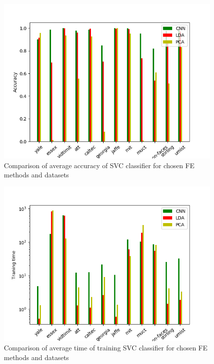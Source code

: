 \documentclass[a4paper, 10 pt, journal]{ieeeconf}
\begin{document}
\begin{figure}[!h]
    \centering
    \includegraphics[scale=0.875]{images/Svm_accuracy_comparison.png}
    \caption{Comparison of average accuracy of SVC classifier for chosen FE methods and datasets}
    \label{fig:svm_acc_comparision}
\end{figure}

\begin{figure}[!h]
    \centering
    \includegraphics[scale=0.875]{images/Svm_fit_time_comparison.png}
    \caption{Comparison of average time of training SVC classifier for chosen FE methods and datasets}
    \label{fig:svm_fit_time_comparision}
\end{figure}
\end{document}
